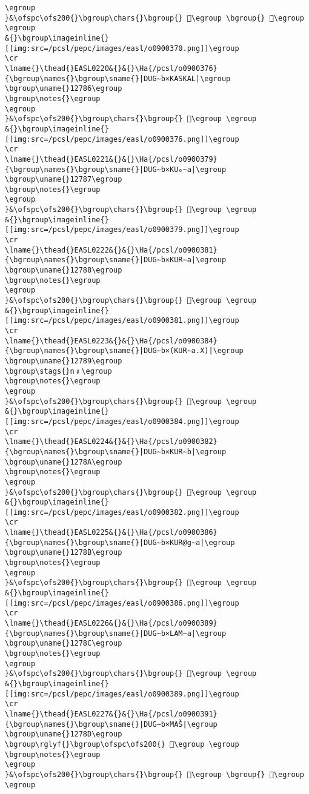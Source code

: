 \begin{verbatim}
\egroup
}&\ofspc\ofs200{}\bgroup\chars{}\bgroup{} 𒞱\egroup \bgroup{} 𒞅\egroup \egroup
&{}\bgroup\imageinline{}[[img:src=/pcsl/pepc/images/easl/o0900370.png]]\egroup
\cr
\lname{}\thead{}EASL0220&{}&{}\Ha{/pcsl/o0900376}{\bgroup\names{}\bgroup\sname{}|DUG∼b×KASKAL|\egroup
\bgroup\uname{}12786\egroup
\bgroup\notes{}\egroup
\egroup
}&\ofspc\ofs200{}\bgroup\chars{}\bgroup{} 𒞆\egroup \egroup
&{}\bgroup\imageinline{}[[img:src=/pcsl/pepc/images/easl/o0900376.png]]\egroup
\cr
\lname{}\thead{}EASL0221&{}&{}\Ha{/pcsl/o0900379}{\bgroup\names{}\bgroup\sname{}|DUG∼b×KU₆∼a|\egroup
\bgroup\uname{}12787\egroup
\bgroup\notes{}\egroup
\egroup
}&\ofspc\ofs200{}\bgroup\chars{}\bgroup{} 𒞇\egroup \egroup
&{}\bgroup\imageinline{}[[img:src=/pcsl/pepc/images/easl/o0900379.png]]\egroup
\cr
\lname{}\thead{}EASL0222&{}&{}\Ha{/pcsl/o0900381}{\bgroup\names{}\bgroup\sname{}|DUG∼b×KUR∼a|\egroup
\bgroup\uname{}12788\egroup
\bgroup\notes{}\egroup
\egroup
}&\ofspc\ofs200{}\bgroup\chars{}\bgroup{} 𒞈\egroup \egroup
&{}\bgroup\imageinline{}[[img:src=/pcsl/pepc/images/easl/o0900381.png]]\egroup
\cr
\lname{}\thead{}EASL0223&{}&{}\Ha{/pcsl/o0900384}{\bgroup\names{}\bgroup\sname{}|DUG∼b×(KUR∼a.X)|\egroup
\bgroup\uname{}12789\egroup
\bgroup\stags{}n﹟\egroup
\bgroup\notes{}\egroup
\egroup
}&\ofspc\ofs200{}\bgroup\chars{}\bgroup{} 𒞉\egroup \egroup
&{}\bgroup\imageinline{}[[img:src=/pcsl/pepc/images/easl/o0900384.png]]\egroup
\cr
\lname{}\thead{}EASL0224&{}&{}\Ha{/pcsl/o0900382}{\bgroup\names{}\bgroup\sname{}|DUG∼b×KUR∼b|\egroup
\bgroup\uname{}1278A\egroup
\bgroup\notes{}\egroup
\egroup
}&\ofspc\ofs200{}\bgroup\chars{}\bgroup{} 𒞊\egroup \egroup
&{}\bgroup\imageinline{}[[img:src=/pcsl/pepc/images/easl/o0900382.png]]\egroup
\cr
\lname{}\thead{}EASL0225&{}&{}\Ha{/pcsl/o0900386}{\bgroup\names{}\bgroup\sname{}|DUG∼b×KUR@g∼a|\egroup
\bgroup\uname{}1278B\egroup
\bgroup\notes{}\egroup
\egroup
}&\ofspc\ofs200{}\bgroup\chars{}\bgroup{} 𒞋\egroup \egroup
&{}\bgroup\imageinline{}[[img:src=/pcsl/pepc/images/easl/o0900386.png]]\egroup
\cr
\lname{}\thead{}EASL0226&{}&{}\Ha{/pcsl/o0900389}{\bgroup\names{}\bgroup\sname{}|DUG∼b×LAM∼a|\egroup
\bgroup\uname{}1278C\egroup
\bgroup\notes{}\egroup
\egroup
}&\ofspc\ofs200{}\bgroup\chars{}\bgroup{} 𒞌\egroup \egroup
&{}\bgroup\imageinline{}[[img:src=/pcsl/pepc/images/easl/o0900389.png]]\egroup
\cr
\lname{}\thead{}EASL0227&{}&{}\Ha{/pcsl/o0900391}{\bgroup\names{}\bgroup\sname{}|DUG∼b×MAŠ|\egroup
\bgroup\uname{}1278D\egroup
\bgroup\rglyf{}\bgroup\ofspc\ofs200{} 𒞍\egroup \egroup
\bgroup\notes{}\egroup
\egroup
}&\ofspc\ofs200{}\bgroup\chars{}\bgroup{} 𒞳\egroup \bgroup{} 𒞍\egroup \egroup

\end{verbatim}
